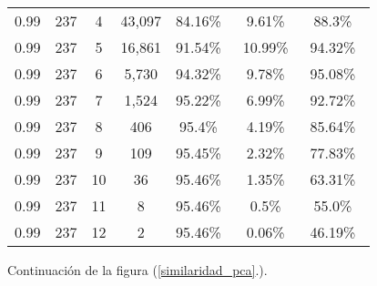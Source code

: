 \begin{figure}[!htbp]
{\begin{tabular}{ |c|c|c|c|c|c|c| }
        0.99             &237             &4            &43,097                 & 84.16\%\     & 9.61\%\               & 88.3\%\ \\
        0.99             &237             &5            &16,861                 & 91.54\%\     & 10.99\%\               & 94.32\%\ \\
        0.99             &237             &6            &5,730                 & 94.32\%\     & 9.78\%\               & 95.08\%\ \\
        0.99             &237             &7            &1,524                 & 95.22\%\     & 6.99\%\               & 92.72\%\ \\
        0.99             &237             &8            &406                 & 95.4\%\     & 4.19\%\               & 85.64\%\ \\
        0.99             &237             &9            &109                 & 95.45\%\     & 2.32\%\               & 77.83\%\ \\
        0.99             &237             &10            &36                 & 95.46\%\     & 1.35\%\               & 63.31\%\ \\
        0.99             &237             &11            &8                 & 95.46\%\     & 0.5\%\               & 55.0\%\ \\
        0.99             &237             &12            &2                 & 95.46\%\     & 0.06\%\               & 46.19\%\ \\
        \hline
        \end{tabular}
    }
    \bigskip
    \caption{Continuación de la figura (\ref{similaridad_pca}.).} \label{similaridad_pca_2}
\end{figure}

\vspace{1em}
